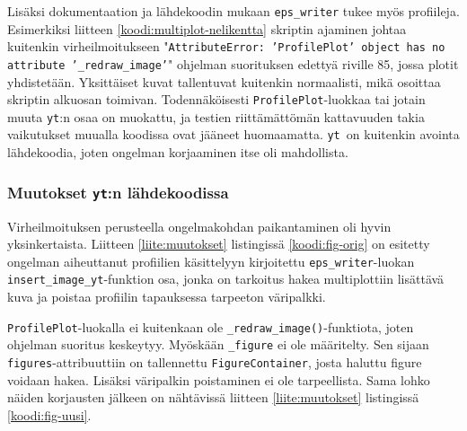 \documentclass[12pt,a4paper]{article}
\newcommand{\yt}{\texttt{yt}}
\begin{document}
Lisäksi dokumentaation \cite{multiplot-api} ja lähdekoodin \cite{multiplot-source} mukaan \texttt{eps\_writer} tukee myös profiileja. Esimerkiksi liitteen \ref{koodi:multiplot-nelikentta} skriptin ajaminen johtaa kuitenkin virheilmoitukseen "\texttt{AttributeError: 'ProfilePlot' object has no attribute '\_redraw\_image'}" ohjelman suorituksen edettyä riville 85, jossa plotit yhdistetään. Yksittäiset kuvat tallentuvat kuitenkin normaalisti, mikä osoittaa skriptin alkuosan toimivan. Todennäköisesti \texttt{ProfilePlot}-luokkaa tai jotain muuta \yt :n osaa on muokattu, ja testien riittämättömän kattavuuden takia vaikutukset muualla koodissa ovat jääneet huomaamatta. \yt\ on kuitenkin avointa lähdekoodia, joten ongelman korjaaminen itse oli mahdollista.



\subsubsection{Muutokset \yt :n lähdekoodissa}
Virheilmoituksen perusteella ongelmakohdan paikantaminen oli hyvin yksinkertaista. Liitteen \ref{liite:muutokset} listingissä \ref{koodi:fig-orig} on esitetty ongelman aiheuttanut profiilien käsittelyyn kirjoitettu \texttt{eps\_writer}-luokan \texttt{insert\_image\_yt}-funktion osa, jonka on tarkoitus hakea multiplottiin lisättävä kuva ja poistaa profiilin tapauksessa tarpeeton väripalkki.

\texttt{ProfilePlot}-luokalla ei kuitenkaan ole \texttt{\_redraw\_image()}-funktiota, joten ohjelman suoritus keskeytyy. Myöskään \texttt{\_figure} ei ole määritelty. Sen sijaan \texttt{figures}-attribuuttiin on tallennettu \texttt{FigureContainer}, josta haluttu figure voidaan hakea. Lisäksi väripalkin poistaminen ei ole tarpeellista. Sama lohko näiden korjausten jälkeen on nähtävissä liitteen \ref{liite:muutokset} listingissä \ref{koodi:fig-uusi}.
\end{document}
